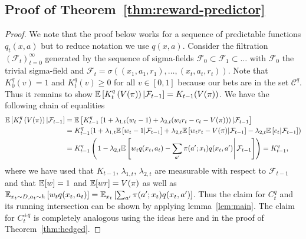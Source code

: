 \subsection{Proof of Theorem~\ref{thm:reward-predictor}}
\begin{proof}
We note that the proof below works for a sequence of 
predictable functions $q_t(x,a)$ but to reduce notation
we use $q(x,a)$.
Consider the filtration $(\mathcal{F}_t)_{t=0}^{\infty}$ generated
by the sequence of sigma-fields 
$\mathcal{F}_0 \subset \mathcal{F}_1 \subset \ldots$ 
with $\mathcal{F}_0$ the trivial sigma-field and 
$\mathcal{F}_t = \sigma((x_1,a_1,r_1),\ldots,(x_t,a_t,r_t))$.
Note that $K_0^{q}(v)=1$ and $K_t^{q}(v)\geq 0$ for all $v \in [0,1]$ 
because our bets are in the set $\mathcal{C}^q$.
Thus it remains to show
$\mathbb{E}\left[K_t^q\left(V(\pi)\right)|\mathcal{F}_{t-1}\right]=K_{t-1}(V(\pi))$.
We have the following chain of equalities
\begin{align*}
    \mathbb{E}\left[K_t^q\left(V(\pi)\right)|\mathcal{F}_{t-1}\right]&=
    \mathbb{E}\left[K_{t-1}^q\left(1+\lambda_{1,t}(w_t-1)+\lambda_{2,t}(w_t r_t - c_t -V(\pi))\right)|\mathcal{F}_{t-1}\right]\\
    &=K_{t-1}^q (1+\lambda_{1,t}\mathbb{E}\left[w_t-1|\mathcal{F}_{t-1}\right]
    +\lambda_{2,t}\mathbb{E}\left[w_t r_t -V(\pi)|\mathcal{F}_{t-1}\right]
    -\lambda_{2,t}\mathbb{E}\left[c_t|\mathcal{F}_{t-1}\right])\\
    &=K_{t-1}^q \left(\left.1-\lambda_{2,t}\mathbb{E}\left[w_t q(x_t,a_t) - \sum_{a'} \pi(a';x_t)q(x_t,a')\right|\mathcal{F}_{t-1}\right]\right) = K_{t-1}^q,
\end{align*}
where we have used that $K_{t-1}$, $\lambda_{1,t}$, $\lambda_{2,t}$
are measurable with respect to $\mathcal{F}_{t-1}$ and that $\mathbb{E}[w]=1$ and 
$\mathbb{E}[wr]=V(\pi)$ as well as $\mathbb{E}_{x_t\sim D,a_t\sim h}\left[w_t q(x_t,a_t)\right] = \mathbb{E}_{x_t}\left[\sum_{a'}\pi(a';x_t)q(x_t,a')\right]$.
Thus the claim for $C_t^q$ and its running intersection can be shown
by applying lemma~\ref{lem:main}. The claim for $C_t^{\pm q}$ is 
completely analogous using the ideas here and in the proof of 
Theorem~\ref{thm:hedged}.
\end{proof}

